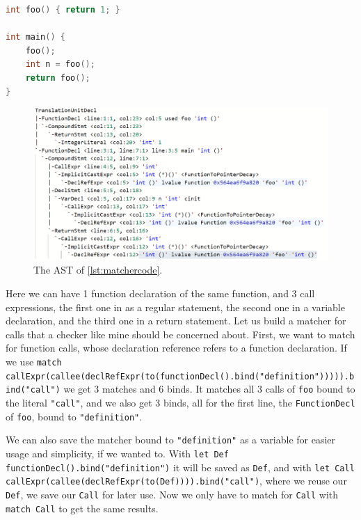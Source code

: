 \begin{lstlisting}[language={C++},caption={A very simple code for matching function calls.},label={lst:matchercode}]
int foo() { return 1; }

int main() {
	foo();
	int n = foo();
	return foo();
}
\end{lstlisting}

\begin{figure}[H]
    \includegraphics[width=\linewidth]{images/ast_for_matching.png}
	\caption{The AST of \cref{lst:matchercode}.}
    \label{fig:ast3}
\end{figure}

Here we can have 1 function declaration of the same function, and 3 call expressions, the first one in as a regular statement, the second one in
a variable declaration, and the third one in a return statement. Let us build a matcher for calls that a checker like mine should be
concerned about.
First, we want to match for function calls, whose declaration reference refers to a function declaration. If we use
\lstinline{match callExpr(callee(declRefExpr(to(functionDecl().bind("definition"))))).bind("call")} we get 3 matches
and 6 binds. It matches all 3 calls of \texttt{foo} bound to the literal \texttt{"call"}, and we also get 3 binds, all for the
first line, the \texttt{FunctionDecl} of \texttt{foo}, bound to \texttt{"definition"}.

We can also save the matcher bound to \texttt{"definition"} as a variable for easier usage and simplicity, if we wanted to.
With \lstinline{let Def functionDecl().bind("definition")} it will be saved as \texttt{Def}, and with
\lstinline{let Call callExpr(callee(declRefExpr(to(Def)))).bind("call")}, where we reuse our \texttt{Def}, we save our \texttt{Call} for later use. Now we only have
to match for \texttt{Call} with \lstinline{match Call} to get the same results.

